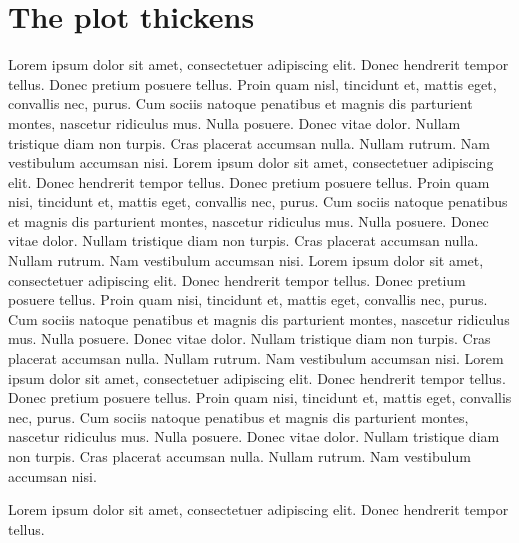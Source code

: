 \documentclass[12pt]{report}
\begin{document}
\chapter{The plot thickens}

Lorem ipsum dolor sit amet, consectetuer adipiscing elit. Donec
hendrerit tempor tellus. Donec pretium posuere tellus. Proin quam
nisl, tincidunt et, mattis eget, convallis nec, purus. Cum sociis
natoque penatibus et magnis dis parturient montes, nascetur ridiculus
mus. Nulla posuere. Donec vitae dolor. Nullam tristique diam non
turpis. Cras placerat accumsan nulla. Nullam rutrum. Nam vestibulum
accumsan nisi.  Lorem ipsum dolor sit amet, consectetuer adipiscing
elit. Donec hendrerit tempor tellus. Donec pretium posuere
tellus. Proin quam nisi, tincidunt et, mattis eget, convallis nec,
purus. Cum sociis natoque penatibus et magnis dis parturient montes,
nascetur ridiculus mus. Nulla posuere. Donec vitae dolor. Nullam
tristique diam non turpis. Cras placerat accumsan nulla. Nullam
rutrum. Nam vestibulum accumsan nisi.  Lorem ipsum dolor sit amet,
consectetuer adipiscing elit. Donec hendrerit tempor tellus. Donec
pretium posuere tellus. Proin quam nisi, tincidunt et, mattis eget,
convallis nec, purus. Cum sociis natoque penatibus et magnis dis
parturient montes, nascetur ridiculus mus. Nulla posuere. Donec vitae
dolor. Nullam tristique diam non turpis. Cras placerat accumsan
nulla. Nullam rutrum. Nam vestibulum accumsan nisi.  Lorem ipsum dolor
sit amet, consectetuer adipiscing elit. Donec hendrerit tempor
tellus. Donec pretium posuere tellus. Proin quam nisi, tincidunt et,
mattis eget, convallis nec, purus. Cum sociis natoque penatibus et
magnis dis parturient montes, nascetur ridiculus mus. Nulla
posuere. Donec vitae dolor. Nullam tristique diam non turpis. Cras
placerat accumsan nulla. Nullam rutrum. Nam vestibulum accumsan nisi.


\begin{war} 
Lorem ipsum dolor sit amet, consectetuer adipiscing elit. Donec
hendrerit tempor tellus.
\end{war}
\end{document}
